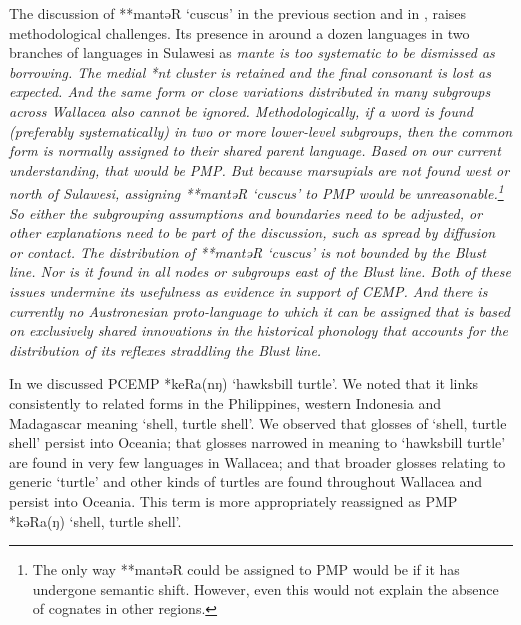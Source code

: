 The discussion of **mantəR ‘cuscus’ in the previous section
and in , raises methodological challenges.
Its presence in around a dozen languages in two branches of 
languages in Sulawesi as \it{mante} is too systematic to be dismissed as borrowing.
The medial *nt cluster is retained
and the final consonant is lost as expected.
And the same form or close variations distributed in many subgroups
across Wallacea also cannot be ignored.
Methodologically, if a word is found (preferably systematically)
in two or more lower-level subgroups,
then the common form is normally assigned to their shared parent language.
Based on our current understanding, that would be PMP.
But because marsupials are not found west or north of Sulawesi,
assigning **mantəR ‘cuscus’ to PMP would be unreasonable.\footnote{
		The only way **mantəR could be assigned to PMP would be if
		it has undergone semantic shift. However, even this
		would not explain the absence of cognates in other regions.}
So either the subgrouping assumptions
and boundaries need to be adjusted,
or other explanations need to be part of the discussion,
such as spread by diffusion or contact.
The distribution of **mantəR ‘cuscus’ is not bounded by the Blust line.
Nor is it found in all nodes or subgroups east of the Blust line.
Both of these issues undermine its usefulness as evidence in support of CEMP.
And there is currently no Austronesian proto-language to which
it can be assigned that is based on exclusively shared innovations
in the historical phonology that accounts for the distribution
of its reflexes straddling the Blust line.

In  we discussed PCEMP *keRa(nŋ) ‘hawksbill turtle’.
We noted that it links consistently to related forms in the Philippines,
western Indonesia and Madagascar meaning ‘shell, turtle shell’.
We observed that glosses of ‘shell,
turtle shell’ persist into Oceania; that glosses narrowed in
meaning to ‘hawksbill turtle’ are found in very few languages
in Wallacea; and that broader glosses relating to generic ‘turtle’
and other kinds of turtles are found throughout Wallacea
and persist into Oceania.
This term is more appropriately reassigned as PMP *kəRa(ŋ) ‘shell, turtle shell’.
